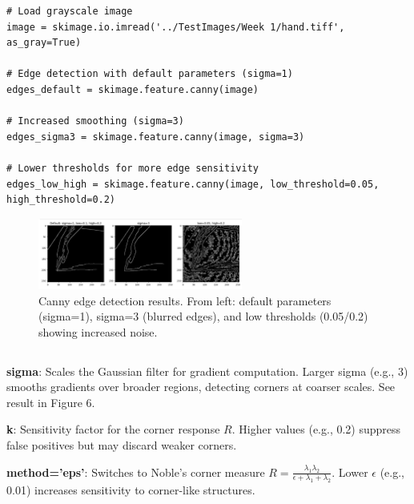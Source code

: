 \documentclass[12pt]{article}
\begin{document}
\begin{lstlisting}
# Load grayscale image
image = skimage.io.imread('../TestImages/Week 1/hand.tiff', as_gray=True)

# Edge detection with default parameters (sigma=1)
edges_default = skimage.feature.canny(image)

# Increased smoothing (sigma=3)
edges_sigma3 = skimage.feature.canny(image, sigma=3)

# Lower thresholds for more edge sensitivity
edges_low_high = skimage.feature.canny(image, low_threshold=0.05, high_threshold=0.2)
\end{lstlisting}

\begin{figure}[h]
    \centering
    \includegraphics[width=0.6\textwidth]{pics/a5-3.1} 
    \caption{Canny edge detection results. From left: default parameters (sigma=1), sigma=3 (blurred edges), and low thresholds (0.05/0.2) showing increased noise.}
\end{figure}

\subsection{}
\textbf{sigma}: Scales the Gaussian filter for gradient computation. Larger sigma (e.g., 3) smooths gradients over broader regions, detecting corners at coarser scales. See result in Figure 6.

\textbf{k}: Sensitivity factor for the corner response \( R \). Higher values (e.g., 0.2) suppress false positives but may discard weaker corners. 

\textbf{method='eps'}: Switches to Noble’s corner measure \( R = \frac{\lambda_1 \lambda_2}{\epsilon + \lambda_1 + \lambda_2} \). Lower \(\epsilon\) (e.g., 0.01) increases sensitivity to corner-like structures.
\end{document}
